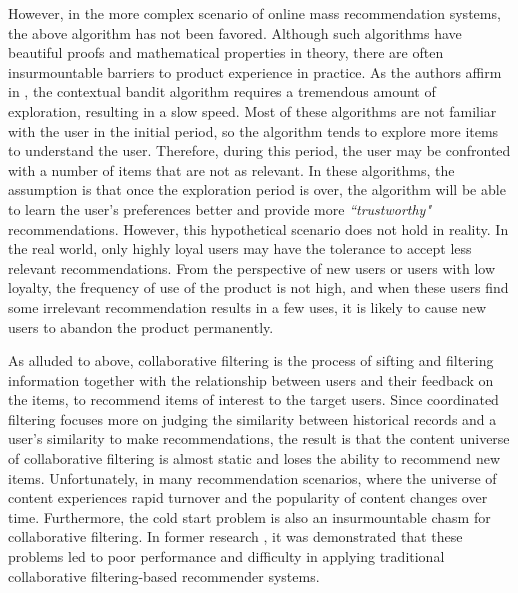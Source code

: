 However, in the more complex scenario of online mass recommendation systems, the above algorithm has not been favored. Although such algorithms have beautiful proofs and mathematical properties in theory, there are often insurmountable barriers to product experience in practice. As the authors affirm in \cite{conversation}, the contextual bandit algorithm requires a tremendous amount of exploration, resulting in a slow speed. Most of these algorithms are not familiar with the user in the initial period, so the algorithm tends to explore more items to understand the user. Therefore, during this period, the user may be confronted with a number of items that are not as relevant. In these algorithms, the assumption is that once the exploration period is over, the algorithm will be able to learn the user's preferences better and provide more \textit{``trustworthy"} recommendations. However, this hypothetical scenario does not hold in reality. In the real world, only highly loyal users may have the tolerance to accept less relevant recommendations. From the perspective of new users or users with low loyalty, the frequency of use of the product is not high, and when these users find some irrelevant recommendation results in a few uses, it is likely to cause new users to abandon the product permanently.

As alluded to above, collaborative filtering is the process of sifting and filtering information together with the relationship between users and their feedback on the items, to recommend items of interest to the target users. Since coordinated filtering focuses more on judging the similarity between historical records and a user’s similarity to make recommendations, the result is that the content universe of collaborative filtering is almost static and loses the ability to recommend new items. Unfortunately, in many recommendation scenarios, where the universe of content experiences rapid turnover and the popularity of content changes over time. Furthermore, the cold start \cite{cold} problem is also an insurmountable chasm for collaborative filtering.  In former research \cite{difficcf}, it was demonstrated that these problems led to poor performance and difficulty in applying traditional collaborative filtering-based recommender systems.

